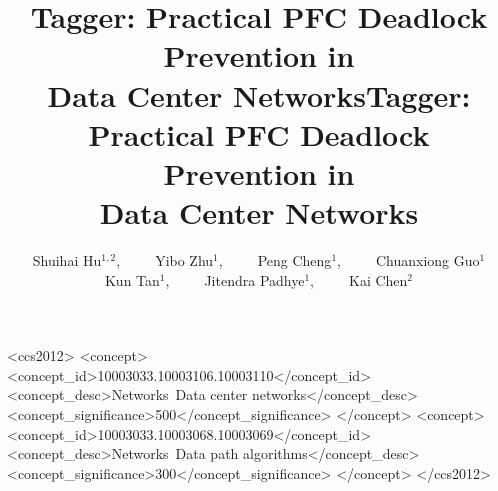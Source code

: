 \documentclass[sigconf]{acmart}
\newcommand{\sysname}{Tagger}
\begin{document}
	
	
	
	
	\title{\sysname{}: Practical PFC Deadlock Prevention in\\Data Center Networks}
	
	\author{Shuihai Hu$^{1,2}$,~~~~~Yibo Zhu$^{1}$,~~~~~Peng Cheng$^{1}$,~~~~~Chuanxiong Guo$^{1}$\\Kun Tan$^{1}$,~~~~~Jitendra Padhye$^{1}$,~~~~~Kai Chen$^{2}$ }
	
	




\title[\sysname{}: Practical PFC Deadlock Prevention in DCNs]{\sysname{}: Practical PFC Deadlock Prevention in\\Data Center Networks}
\renewcommand{\shortauthors}{S. Hu et al.}



%




%

\begin{CCSXML}
	<ccs2012>
	<concept>
	<concept_id>10003033.10003106.10003110</concept_id>
	<concept_desc>Networks~Data center networks</concept_desc>
	<concept_significance>500</concept_significance>
	</concept>
	<concept>
	<concept_id>10003033.10003068.10003069</concept_id>
	<concept_desc>Networks~Data path algorithms</concept_desc>
	<concept_significance>300</concept_significance>
	</concept>
	</ccs2012>
\end{CCSXML}
\end{document}
